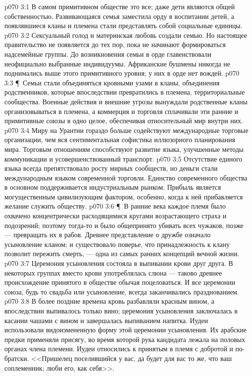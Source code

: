 \vs p070 3:1 В самом примитивном обществе  это все; даже дети являются общей собственностью. Развивающаяся семья заместила орду в воспитании детей, а появлявшиеся кланы и племена стали представлять собой социальные единицы.
\vs p070 3:2 Сексуальный голод и материнская любовь создали семью. Но настоящее правительство не появляется до тех пор, пока не начинают формироваться надсемейные группы. До возникновения семьи в орде главенствовали неофициально выбранные индивидуумы. Африканские бушмены никогда не поднимались выше этого примитивного уровня; у них в орде нет вождей.
\vs p070 3:3 \P\ Семьи стали объединяться кровными узами в кланы, объединения родственников, которые впоследствии превратились в племена, территориальные сообщества. Военные действия и внешние угрозы вынуждали родственные кланы организовываться в племена, а коммерция и торговля сплачивали эти ранние и примитивные союзы в одно целое, обеспечивая относительный мир внутри них.
\vs p070 3:4 Миру на Урантии гораздо больше содействуют международные торговые организации, чем вся сентиментальная софистика иллюзорного планирования мира. Торговым отношениям способствуют развитие языка, улучшенные методы коммуникации и усовершенствованный транспорт.
\vs p070 3:5 Отсутствие единого языка всегда препятствовало росту мирных сообществ, но деньги стали международным языком современной торговли. Единство современного общества в основном поддерживается индустриальным рынком. Прибыль является могущественным цивилизующим фактором, особенно, когда к ней прибавляется желание служить обществу.
\vs p070 3:6 \P\ В ранние века каждое племя было охвачено концентрически расходящимися кругами возрастающего страха и подозрений; поэтому тогда\hyp{}то и было общепринято убивать всех чужаков, позже --- превращать их в рабов. Древнее представление о дружбе означало усыновление кланом; и существовало поверье, что принадлежность к клану позволит пережить смерть, --- одна из самых ранних концепций вечной жизни.
\vs p070 3:7 Церемония усыновления состояла в выпивании крови друг друга. В некоторых группах вместо крови употреблялась слюна --- таково древнее происхождение принятого в обществе обычая поцеловаться. И все церемонии союза, будь то свадьба или усыновление, всегда заканчивались празднованием.
\vs p070 3:8 В более поздние времена кровь разбавляли красным вином, а впоследствии выпивалось только вино; церемония усыновления заключалась в касании чашами с вином и завершалась выпиванием напитка. Иудеи использовали видоизмененную форму этой церемонии усыновления. Их арабские предки применяли присягу, во время которой рука кандидата лежала на половых органах члена племени. Иудеи относились к принятым в племя с добротой и по\hyp{}братски. <<Пришелец поселившийся у вас, да будет для вас то же, что ваш соплеменник; люби его, как себя>>.
